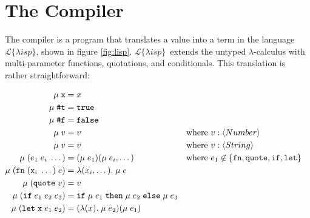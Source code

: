 \documentclass[a4paper]{article}
\newcommand{\lisp}{\ensuremath{\mathcal{L}\{\lambda isp\}}}
\begin{document}
\section{The Compiler}

The compiler is a program that translates a value into a term in the language \lisp, shown in figure \ref{fig:lisp}. \lisp\ extends the untyped $\lambda$-calculus with multi-parameter functions, quotations, and conditionals. This translation is rather straightforward:

$$
\begin{aligned}
\mu\;\mathtt{x} &= x \\
\mu\;\hbox{\texttt{\#}}\mathtt{t} &= \mathtt{true} \\
\mu\;\hbox{\texttt{\#}}\mathtt{f} &= \mathtt{false} \\
\mu\;v &= v && \text{where $v : \langle Number \rangle$} \\
\mu\;v &= v && \text{where $v : \langle String \rangle$} \\
\mu\;\mathtt{(} e_1\;e_i\;\dots \mathtt{)} &= (\mu\;e_1)(\mu\;e_i, \dots) && \text{where $e_1 \not\in \{\mathtt{fn}, \mathtt{quote}, \mathtt{if}, \mathtt{let}\}$} \\
\mu\;\mathtt{(} \mathtt{fn}\;(\mathtt{x}_i\; \dots)\;e \mathtt{)} &= \lambda(x_i, \dots).\;\mu\;e \\
\mu\;\mathtt{(} \mathtt{quote}\;v \mathtt{)} &= v \\
\mu\;\mathtt{(} \mathtt{if}\;e_1\;e_2\;e_3 \mathtt{)} &= \mathtt{if}\;\mu\;e_1\;\mathtt{then}\;\mu\;e_2\;\mathtt{else}\;\mu\;e_3 \\
\mu\;\mathtt{(} \mathtt{let}\;\mathtt{x}\;e_1\;e_2 \mathtt{)} &= (\lambda(x).\;\mu\;e_2)(\mu\;e_1) \\
\end{aligned}
$$
\end{document}
